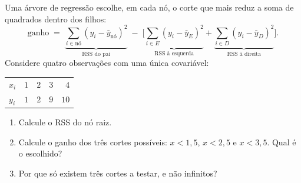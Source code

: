 \documentclass[11pt,a4paper]{article}
\begin{document}
\begin{exercicio}
Uma árvore de regressão escolhe, em cada nó, o corte que mais reduz a soma de
quadrados dentro dos filhos:
\[
  \text{ganho} \;=\;
  \underbrace{\sum_{i\in\text{nó}}(y_i-\bar y_{\text{nó}})^2}_{\text{RSS do pai}}
  \;-\;
  \Big[\underbrace{\sum_{i\in E}(y_i-\bar y_E)^2}_{\text{RSS à esquerda}}
     + \underbrace{\sum_{i\in D}(y_i-\bar y_D)^2}_{\text{RSS à direita}}\Big].
\]
Considere quatro observações com uma única covariável:
\begin{center}\small
\begin{tabular}{@{}lrrrr@{}}
\toprule
$x_i$ & $1$ & $2$ & $3$ & $4$ \\
$y_i$ & $1$ & $2$ & $9$ & $10$ \\
\bottomrule
\end{tabular}
\end{center}
\begin{enumerate}[label=(\alph*),leftmargin=1.1cm]
  \item Calcule o RSS do nó raiz.
  \item Calcule o ganho dos três cortes possíveis: $x<1{,}5$, $x<2{,}5$ e
        $x<3{,}5$. Qual é o escolhido?
  \item Por que só existem três cortes a testar, e não infinitos?
\end{enumerate}
\end{exercicio}
\end{document}
